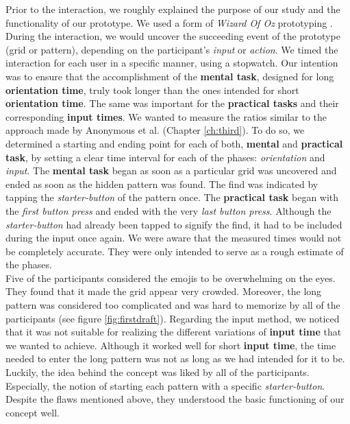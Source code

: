Prior to the interaction, we roughly explained the purpose of our study and the functionality of our prototype. We used a form of \textit{Wizard Of Oz} prototyping \cite{Butz2014}. During the interaction, we would uncover the succeeding event of the prototype (grid or pattern), depending on the participant's \textit{input} or \textit{action}. We timed the interaction for each user in a specific manner, using a stopwatch. Our intention was to ensure that the accomplishment of the \textbf{mental task}, designed for long \textbf{orientation time}, truly took longer than the ones intended for short \textbf{orientation time}. The same was important for the \textbf{practical tasks} and their corresponding \textbf{input times}. We wanted to measure the ratios similar to the approach made by Anonymous et al. \cite{anonymous} (Chapter \ref{ch:third}). To do so, we determined a starting and ending point for each of both, \textbf{mental} and \textbf{practical task}, by setting a clear time interval for each of the phases: \textit{orientation} and \textit{input}. The \textbf{mental task} began as soon as a particular grid was uncovered and ended as soon as the hidden pattern was found. The find was indicated by tapping the \textit{starter-button} of the pattern once. The \textbf{practical task} began with the \textit{first button press} and ended with the very \textit{last button press}. Although the \textit{starter-button} had already been tapped to signify the find, it had to be included during the input once again. We were aware that the measured times would not be completely accurate. They were only intended to serve as a rough estimate of the phases.\\


Five of the participants considered the emojis to be overwhelming on the eyes. They found that it made the grid appear very crowded. Moreover, the long pattern was considered too complicated and was hard to memorize by all of the participants (see figure \ref{fig:firstdraft}). Regarding the input method, we noticed that it was not suitable for realizing the different variations of \textbf{input time} that we wanted to achieve. Although it worked well for short \textbf{input time}, the time needed to enter the long pattern was not as long as we had intended for it to be.
Luckily, the idea behind the concept was liked by all of the participants. Especially, the notion of starting each pattern with a specific \textit{starter-button}. Despite the flaws mentioned above, they understood the basic functioning of our concept well. \\


